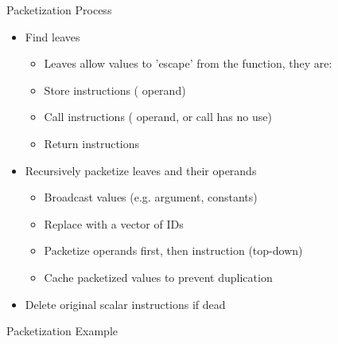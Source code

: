\begin{frame}{Packetization Process}

\begin{itemize}
    \item Find leaves
    \begin{itemize}
        \item Leaves allow  values to 'escape' from the function, they are:
        \item Store instructions ( operand)
        \item Call instructions ( operand, or call has no use)
        \item Return instructions
    \end{itemize}
\end{itemize}

\begin{itemize}
    \item Recursively packetize leaves and their operands
    \begin{itemize}
        \item Broadcast  values (e.g. argument, constants)
        \item Replace  with a vector of IDs
        \item Packetize operands first, then instruction (top-down)
        \item Cache packetized values to prevent duplication
    \end{itemize}
\end{itemize}

\begin{itemize}
    \item Delete original scalar instructions if dead
\end{itemize}

\end{frame}


\begin{frame}[c]{Packetization Example}


\end{frame}

